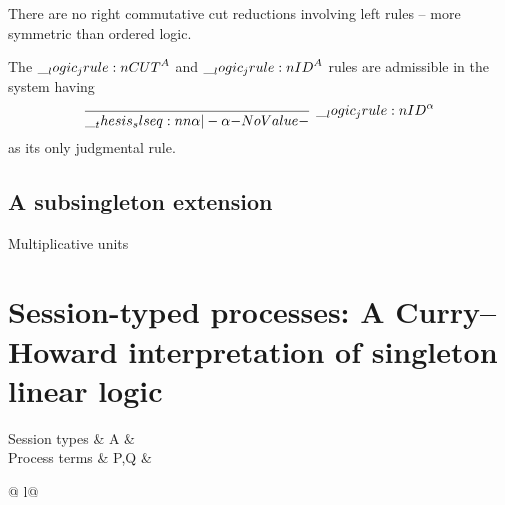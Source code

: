 There are no right commutative cut reductions involving left rules -- more symmetric than ordered logic.

\begin{theorem}
  The $\__logic_jrule:n {CUT}^A$ and $\__logic_jrule:n {ID}^A$ rules are admissible in the system having
  \begin{equation*}
    \infer[\normalfont\jrule{ID}^{\alpha}]{\slseq{\alpha |- \alpha}}{}
  \end{equation*}
  as its only judgmental rule.
\end{theorem}


\subsection{A subsingleton extension}

Multiplicative units


\section{Session-typed processes: A Curry--Howard interpretation of singleton linear logic}

\begin{syntax*}
  Session types &
    A & \alpha \mid {} \mid {}
  \\
  Process terms &
    P,Q &  \mid \fwd
            \begin{array}[t]{@{{} \mid {}}l@{}}
              \selectR{\kay} \mid {} \\
               \mid \selectL{\kay}
            \end{array}
\end{syntax*}


